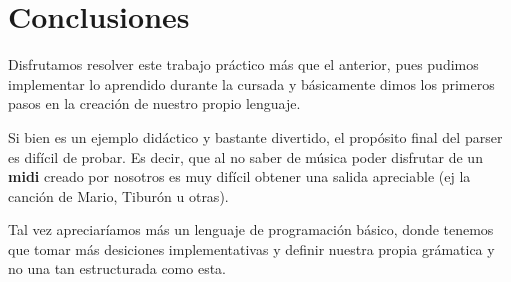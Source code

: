 \section{Conclusiones}

Disfrutamos resolver este trabajo práctico más que el anterior, pues pudimos implementar lo aprendido durante la cursada y básicamente dimos los primeros pasos en la creación de nuestro propio lenguaje.

Si bien es un ejemplo didáctico y bastante divertido, el propósito final del parser es difícil de probar. Es decir, que al no saber de música poder disfrutar de un \textbf{midi} creado por nosotros es muy difícil obtener una salida apreciable (ej la canción de Mario, Tiburón u otras).

Tal vez apreciaríamos más un lenguaje de programación básico, donde tenemos que tomar más desiciones implementativas y definir nuestra propia grámatica y no una tan estructurada como esta.